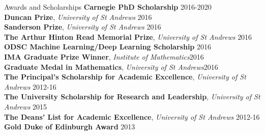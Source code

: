 \documentclass{resume} %
\begin{document}
\begin{rSection}{Awards and Scholarships} \itemsep -3pt        
\textbf{Carnegie PhD Scholarship} \hfill 2016-2020 \\
\textbf{Duncan Prize}, \emph{University of St Andrews} \hfill {2016} \\
\textbf{Sanderson Prize}, \emph{University of St Andrews} \hfill {2016} \\
\textbf{The Arthur Hinton Read Memorial Prize}, \emph{University of St Andrews} \hfill {2016}\\
\textbf{ODSC Machine Learning/Deep Learning Scholarship} \hfill {2016}\\
\textbf{IMA Graduate Prize Winner}, \emph{Institute of Mathematics}\hfill {2016}\\
\textbf{Graduate Medal in Mathematics}, \emph{University of St Andrews}\hfill {2016}\\
\textbf{The Principal's Scholarship for Academic Excellence}, \emph{University of St Andrews} \hfill {2012-16} \\
\textbf{The University Scholarship for Research and Leadership}, \emph{University of St Andrews} \hfill {2015}\\
\textbf{The Deans' List for Academic Excellence}, \emph{University of St Andrews} \hfill {2012-16}\\
\textbf{Gold Duke of Edinburgh Award} \hfill {2013}
\end{rSection}
\end{document}
